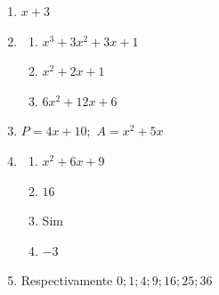 \begin{description}
\begin{enumerate}[label=\textbf{\thesection.\thetempi.\thetempii}]
\begin{multicols}{5}
\begin{enumerate}[label=\alph*)]
                \item $2x^2+6x$
                
                \item $2cm$
                
                \item $4cm$
                
                \item $3$
            \end{enumerate}
        \end{multicols}
        
        \item $x+3$
        
        \item \begin{multicols}{3}
            \begin{enumerate}[label=\alph*)]
                \item $x^3+3x^2+3x+1$
                
                \item $x^2+2x+1$
                
                \item $6x^2+12x+6$
            \end{enumerate}
        \end{multicols}
        
        \item $P=4x+10;$ $A=x^2+5x$
        
        \item \begin{multicols}{4}
            \begin{enumerate}[label=\alph*)]
                \item $x^2+6x+9$
                
                \item $16$
                
                \item Sim
                
                \item $-3$
            \end{enumerate}
        \end{multicols}
        
        \item Respectivamente $0;1;4;9;16;25;36$
        

\end{enumerate}
\end{description}
